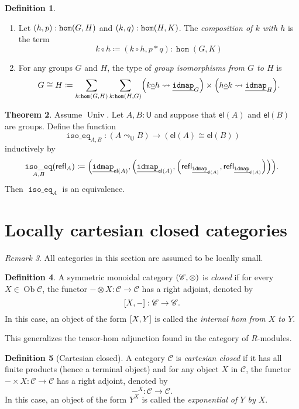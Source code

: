 \documentclass[10pt,letterpaper,cm]{nupset}
\theoremstyle{definition}
\newtheorem{definition}{Definition}[subsection]
\theoremstyle{theorem}
\newtheorem{theorem}[definition]{Theorem}
\theoremstyle{remark}
\newtheorem{remark}[definition]{Remark}
\DeclareMathOperator{\ob}{Ob}
\newcommand{\refl}{\mathsf{refl}}
\newcommand{\U}{\mathsf{U}}
\newcommand{\el}{\mathsf{el}}
\newcommand{\0}{\mathbf{0}}
\newcommand{\1}{\mathbf{1}}
\newcommand{\2}{\mathbf{2}}
\DeclareMathOperator{\idmap}{\mathtt{idmap}}
\DeclareMathOperator{\isoeq}{\mathtt{iso\_eq}}
\DeclareMathOperator{\homm}{\mathtt{hom}}
\DeclareMathOperator{\univ}{\mathrm{Univ}}
\renewcommand{\c}{\mathscr{C}}
\newcommand{\be}{\begin{enumerate}}
\newcommand{\ee}{\end{enumerate}}
\begin{document}
\begin{definition} $ $
\be
\item Let $\mleft(h, p\mright) : \homm(G, H)$ and $\mleft(k, q\mright): \homm(H, K)$. The \textit{composition of $k$ with $h$} is the term
 $$k \underline{\circ} h \coloneqq (k \circ h, p \ast q) : \homm(G, K)$$
\item For any groups $G$ and $H$, the type of \textit{group isomorphisms from $G$ to $H$} is 
\[
G\cong H \coloneqq 
\sum_{h : \homm(G, H)} \sum_{k : \homm(H, G)}\mleft(k \underline{\circ} h \leadsto \underline{\idmap}_{G}\mright) \times\mleft(h \underline{\circ} k \leadsto \underline{\idmap}_{H}\mright)
. \]
\ee 
\end{definition} 

\begin{theorem}
Assume $\univ$. Let $A, B :\U$ and suppose that $\el(A)$ and $\el(B)$ are groups. Define the function $$\isoeq_{A,B} : (A \leadsto_{\U} B) \to (\el(A) \cong \el(B))$$ inductively by $$\isoeq_{A,B}(\refl_A) \coloneqq \mleft(\underline{\idmap}_{\el(A)}, \mleft(\underline{\idmap}_{\el(A)}, \mleft(\refl_{\underline{\idmap}_{\el(A)}}, \refl_{\underline{\idmap}_{\el(A)}}\mright)\mright)\mright).$$ Then $\isoeq_A$ is an equivalence. 
\end{theorem}

\section{Locally cartesian closed categories}\label{LCC}

\begin{remark}
All categories in this section are assumed to be locally small.
\end{remark}

\begin{definition}\label{tens-hom}
A symmetric monoidal category $\mleft(\c, \otimes\mright)$ is \textit{closed} if for every $X\in \ob{\c}$, the functor ${-}\otimes X: \c \to \c$ has a right adjoint, denoted by
\[
\mleft[X, {-}\mright] : \c \to \c.
\] In this case, an object of the form $\mleft[X, Y\mright]$ is called the \textit{internal hom from $X$ to $Y$}.
\end{definition}

This generalizes the tensor-hom adjunction found in the category of $R$-modules.

\smallskip

\begin{definition}[Cartesian closed]
A category $\c$ is \textit{cartesian closed} if it has all finite products (hence a terminal object) and for any object $X$ in $\c$, the functor $ {-} \times X : \c \to \c   $ has a  right adjoint,  denoted by $${-}^X : \c \to \c.$$ In this case, an object of the form $Y^X$ is called the \textit{exponential of $Y$ by $X$}.
\end{definition}
\end{document}
